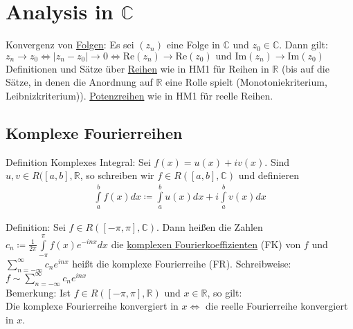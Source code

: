 \section{Analysis in $\mathbb{C}$}
Konvergenz von \underline{Folgen}: Es sei $(z_n)$ eine Folge in $\mathbb{C}$ und $z_0 \in \mathbb{C}$. Dann gilt: 
$z_n \to z_0 \Leftrightarrow \lvert z_n - z_0 \rvert \to 0 \Leftrightarrow \text{Re}(z_n) \to \text{Re}(z_0) 
\text{ und Im}(z_n) \to \text{Im}(z_0)$ \\
Definitionen und Sätze über \underline{Reihen} wie in HM1 für Reihen in $\mathbb{R}$ (bis auf die Sätze, in denen die Anordnung auf $\mathbb{R}$
eine Rolle spielt (Monotoniekriterium, Leibnizkriterium)). \underline{Potenzreihen} wie in HM1 für reelle Reihen. 

\subsection{Komplexe Fourierreihen}
Definition Komplexes Integral:
Sei $f(x)=u(x) + iv(x)$. Sind $u,v \in R([a,b],\mathbb{R}$, so schreiben wir $f \in R([a,b],\mathbb{C})$ und definieren
\begin{align*}
    \int \limits_a^b f(x) dx \coloneqq \int \limits_a^b u(x) dx + i \int \limits_a^b v(x) dx
\end{align*}

Definition: Sei $f \in R([-\pi,\pi],\mathbb{C})$. Dann heißen die Zahlen $c_n \coloneqq \frac{1}{2\pi} \int \limits_{-\pi}^{\pi} f(x) e^{-inx} dx$
die \underline{komplexen Fourierkoeffizienten} (FK) von $f$ und $\sum \limits_{n= - \infty}^{\infty} c_n e^{inx}$ heißt
die komplexe Fourierreihe (FR). Schreibweise: $f \sim \sum \limits_{n=- \infty}^{\infty} c_n e^{inx}$ \\
Bemerkung: Ist $f \in R([-\pi, \pi], \mathbb{R}) \text{ und } x \in \mathbb{R}$, so gilt: \\
Die komplexe Fourierreihe konvergiert in $x \Leftrightarrow$ die reelle Fourierreihe konvergiert in $x$.